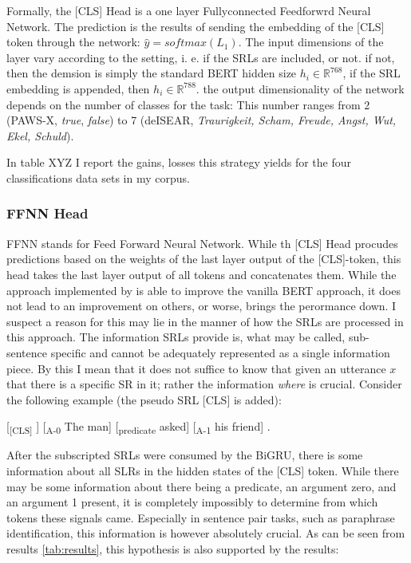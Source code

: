 Formally, the [CLS] Head is a one layer Fullyconnected Feedforwrd Neural Network. The
prediction is the results of sending the embedding of the [CLS] token through the network:
$\hat{y} = softmax(L_1)$. The input dimensions of the layer vary according to the setting,
i. e. if the SRLs are included, or not. if not, then the demsion is simply the standard
BERT hidden size $h_i \in \mathbb{R}^768$, if the SRL embedding is appended, then $h_i \in
\mathbb{R}^788$. the output dimensionality of the network depends on the number of classes
for the task: This number ranges from 2 (PAWS-X, \emph{true}, \emph{false}) to 7 (deISEAR,
\emph{Traurigkeit, Scham, Freude, Angst, Wut, Ekel, Schuld}).



In table XYZ I report the gains, losses this strategy yields for the four classifications data sets
in my corpus.


\subsubsection{FFNN Head}

FFNN stands for Feed Forward Neural Network. While th [CLS] Head procudes predictions based on the
weights of the last layer output of the [CLS]-token, this head takes the last layer output of all
tokens and concatenates them.
While the approach implemented by \cite{zhang2019semantics} is able to improve the vanilla
BERT approach, it does not lead to an improvement on others, or worse, brings the perormance
down. I suspect a reason for this may lie in the manner of how the SRLs are processed in this
approach. The information SRLs provide is, what may be called, sub-sentence specific and
cannot be adequately represented as a single information piece. By this I mean that it does
not suffice to know that given an utterance $x$ that there is a specific SR in it; rather the
information \emph{where} is crucial. Consider the following example (the pseudo SRL [CLS] is
added):


[\textsubscript{[CLS]} ] [\textsubscript{A-0} The man] [\textsubscript{predicate} asked] [\textsubscript{A-1} his friend] .

After the subscripted SRLs were consumed by the BiGRU, there is some information about all
SLRs in the hidden states of the [CLS] token. While there may be some information about there
being a predicate, an argument zero, and an argument 1 present, it is completely impossibly
to determine from which tokens these signals came. Especially in sentence pair tasks, such
as paraphrase identification, this information is however absolutely crucial. As can be seen
from results \ref{tab:results}, this hypothesis is also supported by the results:

